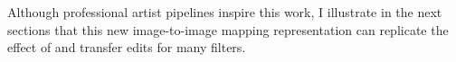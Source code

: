 \begin{itemize}
\begin{figure}[ht]
\label{fig:PS-all-together}
\end{figure}

\end{itemize}
Although professional artist pipelines inspire this work, I illustrate in the next sections that this new image-to-image mapping representation can replicate the effect of and transfer edits for many filters.
